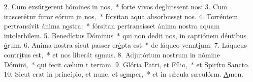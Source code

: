 2. Cum exsúrgerent hómines \uline{i}n nos,~* forte vivos deglutss\uline{e}nt nos:
3. Cum irascerétur furor eórum \uline{i}n nos,~* fórsitan aqua absorbuss\uline{e}t nos.
4. Torréntem pertransívit ánima n\uline{o}stra:~* fórsitan pertransísset ánima nostra aquam intolerb\uline{i}lem.
5. Benedíctus D\uline{ó}minus~* qui non dedit nos, in captiónem déntibus \uline{ó}rum.
6. Anima nostra sicut passer er\uline{é}pta est~* de láqueo vennt\uline{i}um.
7. Láqueus contr\uline{í}tus est,~* et nos liberát s\uline{u}mus.
8. Adjutórium nostrum in nómine D\uline{ó}mini,~* qui fecit cælum t t\uline{e}rram.
9. Glória Patri, et F\uline{í}lio,~* et Spirítu S\uline{a}ncto.
10. Sicut erat in princípio, et nunc, et s\uline{e}mper,~* et in sǽcula sæculórm. \uline{A}men.
